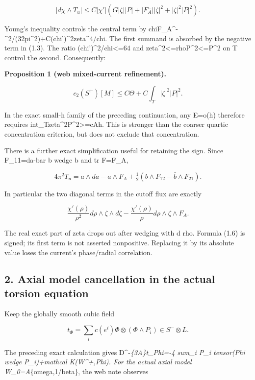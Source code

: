 \documentclass[
  10pt,
]{article}
\begin{document}
\[
 |d\chi\wedge T_u|\le C|\chi'|
 (G|\zeta||P|+|F_A^-||\zeta|^2+|\zeta|^2|P|^2).
\]

Young's inequality controls the central term by
chi\textbar F\_A\^{}-\textbar\^{}2/(32pi\^{}2)+C(chi')\^{}2\textbar zeta\textbar\^{}4/chi.
The first summand is absorbed by the negative term in (1.3). The ratio
(chi')\^{}2/chi\textless=64 and
\textbar zeta\textbar\^{}2\textless=rho\textbar P\textbar\^{}2\textless=\textbar P\textbar\^{}2
on T control the second. Consequently:

\textbf{Proposition 1 (web mixed-current refinement).}

\[
 \boxed{c_2(S^+)[M]\le C\Theta+C\int_T|\zeta|^2|P|^2.} \tag{1.4}
\]

In the exact small-h family of the preceding continuation, any E=o(h)
therefore requires
int\_T\textbar zeta\textbar\^{}2\textbar P\textbar\^{}2\textgreater=cAh.
This is stronger than the coarser quartic concentration criterion, but
does not exclude that concentration.

There is a further exact simplification useful for retaining the sign.
Since F\_11=da-bar b wedge b and tr F=F\_A,

\[
 \boxed{4\pi^2T_u=a\wedge da-a\wedge F_A
 +\tfrac12(b\wedge F_{12}-\bar b\wedge F_{21}).}       \tag{1.5}
\]

In particular the two diagonal terms in the cutoff flux are exactly

\[
 \frac{\chi'(\rho)}{\rho^2}d\rho\wedge\zeta\wedge d\zeta
 -\frac{\chi'(\rho)}\rho d\rho\wedge\zeta\wedge F_A.  \tag{1.6}
\]

The real exact part of zeta drops out after wedging with d rho. Formula
(1.6) is signed; its first term is not asserted nonpositive. Replacing
it by its absolute value loses the current's phase/radial correlation.

\hypertarget{axial-model-cancellation-in-the-actual-torsion-equation}{%
\subsection{2. Axial model cancellation in the actual torsion
equation}\label{axial-model-cancellation-in-the-actual-torsion-equation}}

Keep the globally smooth cubic field

\[
 t_\Phi=\sum_i c(e^i)\Phi\otimes(\Phi\wedge P_i)\in S^-\otimes L.
\]

The preceding exact calculation gives D\^{}-\emph{\{3A\}t\_Phi=-4 sum\_i
P\_i tensor(Phi wedge P\_i)+mathcal K(W\^{}+,Phi). For the actual axial
model W\_0=A}\{omega,1/beta\}, the web note observes
\end{document}
